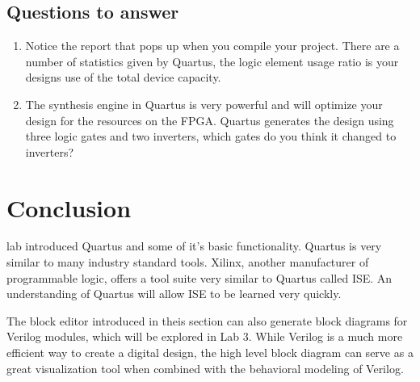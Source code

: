 \documentclass[12pt,journal]{IEEEtran}
\begin{document}
    \subsection{Questions to answer}
    \begin{enumerate}
      \item Notice the report that pops up when you compile your project. There are a number of statistics given
            by Quartus, the logic element usage ratio is your designs use of the total device capacity.
      \item The synthesis engine in Quartus is very powerful and will optimize your design for the resources on the FPGA. Quartus generates the design using three logic gates and two inverters, which gates do you think it changed to inverters?
    \end{enumerate}

  \section{Conclusion}
     lab introduced Quartus and some of it's basic functionality. Quartus is very similar to many industry standard tools. Xilinx, another manufacturer of programmable logic, offers a tool suite very similar to Quartus called ISE. An understanding of Quartus will allow ISE to be learned very quickly.

     The block editor introduced in theis section can also generate block diagrams for Verilog modules, which will be explored in Lab 3. While Verilog is a much more efficient way to create a digital design, the high level block diagram can serve as a great visualization tool when combined with the behavioral modeling of Verilog.

    
\end{document}
